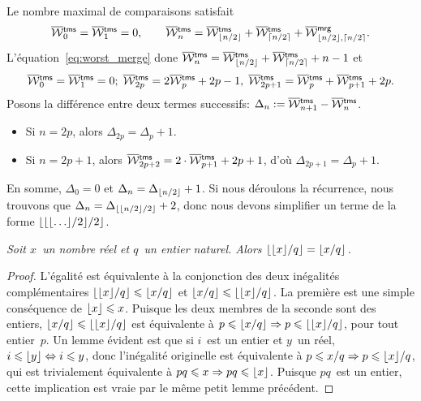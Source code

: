 Le nombre maximal de comparaisons satisfait
\begin{equation*}
\OW{\fun{tms}}{0} = \OW{\fun{tms}}{1} = 0,
\qquad
\OW{\fun{tms}}{n} = \OW{\fun{tms}}{\floor{n/2}}
+ \OW{\fun{tms}}{\ceiling{n/2}}
+ \OW{\fun{mrg}}{\floor{n/2},\ceiling{n/2}}.
\index{tms@$\OW{\fun{tms}}{n}$|(}
\index{mrg@\fun{mrg/2}}
\end{equation*}
L'équation~\eqref{eq:worst_merge}  done
\(\OW{\fun{tms}}{n} = \OW{\fun{tms}}{\floor{n/2}} +
\OW{\fun{tms}}{\ceiling{n/2}} + n - 1\) et
\begin{equation*}
\OW{\fun{tms}}{0} = \OW{\fun{tms}}{1} = 0;\;
\OW{\fun{tms}}{2p} = 2\OW{\fun{tms}}{p} + 2p - 1,\;
\OW{\fun{tms}}{2p+1} = \OW{\fun{tms}}{p} + \OW{\fun{tms}}{p+1} + 2p.
\end{equation*}
Posons la différence entre deux termes successifs: \(\Delta_n :=
\smash[t]{\OW{\fun{tms}}{n+1}} - \OW{\fun{tms}}{n}\).
\begin{itemize}

  \item Si \(n=2p\), alors \(\Delta_{2p} = \Delta_{p} + 1\).

  \item Si \(n=2p+1\), alors \(\OW{\fun{tms}}{2p+2} = 2 \cdot
  \OW{\fun{tms}}{p+1} + 2p + 1\), d'où \(\Delta_{2p+1} = \Delta_{p} +
  1\).

\end{itemize}
En somme, \(\Delta_0 = 0\) et \(\Delta_n = \Delta_{\lfloor{n/2}\rfloor} +
1\). Si nous déroulons la récurrence, nous trouvons que \(\Delta_n =
\Delta_{\lfloor{\lfloor{n/2}\rfloor/2}\rfloor}+ 2\), donc nous devons simplifier
un terme de la forme \(\lfloor{\lfloor{\lfloor{\dots}\rfloor/2}\rfloor/2}\rfloor\).
\begin{thm}
\label{thm_floors}
\textsl{Soit \(x\)~un nombre réel et \(q\)~un entier naturel. Alors
  \(\lfloor{\lfloor{x}\rfloor/q}\rfloor = \lfloor{x/q}\rfloor\).}
\end{thm}
\begin{proof}
  L'égalité est équivalente à la conjonction des deux inégalités
  complémentaires \(\lfloor{\lfloor{x}\rfloor/q}\rfloor \leqslant \lfloor{x/q}\rfloor\) et
  \(\lfloor{x/q}\rfloor \leqslant \lfloor{\lfloor{x}\rfloor/q}\rfloor\). La première est une
  simple conséquence de \(\lfloor{x}\rfloor \leqslant x\). Puisque les deux
  membres de la seconde sont des entiers, \(\lfloor{x/q}\rfloor \leqslant
  \lfloor{\lfloor{x}\rfloor/q}\rfloor\) est équivalente à \(p \leqslant \lfloor{x/q}\rfloor
  \Rightarrow p \leqslant \lfloor{\lfloor{x}\rfloor/q}\rfloor\), pour tout
  entier~\(p\). Un lemme évident est que si \(i\)~est un entier et
  \(y\)~un réel, \(i \leqslant \lfloor{y}\rfloor \Leftrightarrow i
  \leqslant y\), donc l'inégalité originelle est équivalente à
  \(p \leqslant x/q \Rightarrow p \leqslant \lfloor{x}\rfloor/q\), qui est
  trivialement équivalente à \(pq \leqslant x \Rightarrow pq \leqslant
  \lfloor{x}\rfloor\). Puisque \(pq\)~est un entier, cette implication est
  vraie par le même petit lemme précédent.
\end{proof}
